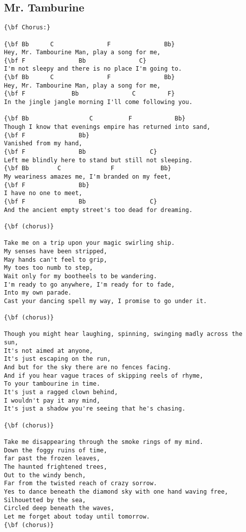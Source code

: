 \documentclass[a4paper]{article}
\begin{document}
\newpage
\subsection{Mr. Tamburine} %
\label{sub:Mr. Tamburine}
\begin{Verbatim}[commandchars=\\\{\}]
{\bf Chorus:}

{\bf Bb      C               F               Bb}
Hey, Mr. Tambourine Man, play a song for me,
{\bf F               Bb               C}
I'm not sleepy and there is no place I'm going to.
{\bf Bb      C               F               Bb}
Hey, Mr. Tambourine Man, play a song for me,
{\bf F             Bb               C         F}
In the jingle jangle morning I'll come following you.

{\bf Bb                 C          F            Bb}
Though I know that evenings empire has returned into sand,
{\bf F               Bb}
Vanished from my hand,
{\bf F               Bb                  C}
Left me blindly here to stand but still not sleeping.
{\bf Bb        C              F             Bb}
My weariness amazes me, I'm branded on my feet,
{\bf F               Bb}
I have no one to meet,
{\bf F               Bb                  C}
And the ancient empty street's too dead for dreaming.

{\bf (chorus)}

Take me on a trip upon your magic swirling ship.
My senses have been stripped,
May hands can't feel to grip,
My toes too numb to step,
Wait only for my bootheels to be wandering.
I'm ready to go anywhere, I'm ready for to fade,
Into my own parade.
Cast your dancing spell my way, I promise to go under it.

{\bf (chorus)}

Though you might hear laughing, spinning, swinging madly across the sun,
It's not aimed at anyone,
It's just escaping on the run,
And but for the sky there are no fences facing.
And if you hear vague traces of skipping reels of rhyme,
To your tambourine in time.
It's just a ragged clown behind,
I wouldn't pay it any mind,
It's just a shadow you're seeing that he's chasing.

{\bf (chorus)}

Take me disappearing through the smoke rings of my mind.
Down the foggy ruins of time,
far past the frozen leaves,
The haunted frightened trees,
Out to the windy bench,
Far from the twisted reach of crazy sorrow.
Yes to dance beneath the diamond sky with one hand waving free,
Silhouetted by the sea,
Circled deep beneath the waves,
Let me forget about today until tomorrow.
{\bf (chorus)}
\end{Verbatim}
\newpage
\end{document}
